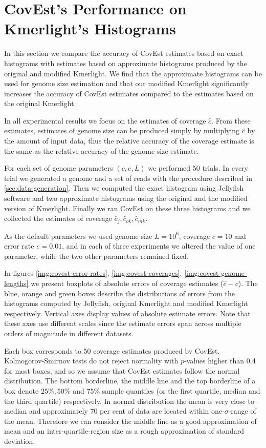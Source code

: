 \section{CovEst's Performance on Kmerlight's Histograms}
In this section we compare the accuracy of CovEst estimates based on exact histograms
with estimates based on approximate histograms produced by the original and modified Kmerlight.
We find that the approximate histograms can be used for genome size estimation and that
our modified Kmerlight significantly increases the accuracy of CovEst estimates compared to
the estimates based on the original Kmerlight.

In all experimental results we focus on the estimates of coverage $\hat c$. From these estimates,
estimates of genome size can be produced simply by multiplying $\hat c$ by the amount of input
data, thus the relative accuracy of the coverage estimate is the same as the relative accuracy of 
the genome size estimate.

For each set of genome parameters $(c, e, L)$ we performed 50 trials.
In every trial we generated a genome and a set of reads with the procedure described
in \ref{sec:data-generation}. Then we computed the exact histogram using Jellyfish software
\cite{Marcais2011}
and two approximate histograms using the original and the modified version of Kmerlight.
Finally we ran CovEst on these three histograms and we collected the estimates of coverage
$\hat c_j, \hat c_{ok}, \hat c_{mk}$. 

As the default parameters we used genome size $L=10^6$, coverage $c=10$ and error rate $e=0.01$,
and in each of three experiments we altered the value of one parameter, while the two other parameters
remained fixed. 

In figures \ref{img:covest-error-rates}, \ref{img:covest-coverages}, 
\ref{img:covest-genome-lengths} we present boxplots of absolute errors of coverage estimates
($\hat c - c$). The blue, orange and green boxes describe the distributions of errors
from the histograms computed by Jellyfish, original Kmerlight and modified Kmerlight respectively.
Vertical axes display values of absolute estimate errors. Note that these axes use different
scales since the estimate errors span across multiple orders of magnitude in different datasets.

Each box corresponds to 50 coverage estimates produced by CovEst. Kolmogorov-Smirnov tests do not
reject normality with $p$-values higher than 0.4 for most boxes, and so we assume that CovEst
estimates follow the normal distribution. The bottom borderline, the middle line 
and the top borderline of a box denote $25\%, 50\%$ and $75\%$ sample quantiles (or 
the first quartile, median and the third quartile) respectively. In normal distribution the mean is
very close to median and approximately $70$ per cent of data are located within one-$\sigma$-range 
of the mean. Therefore we can consider the middle line as a good approximation of mean and 
an inter-quartile-region size as a rough approximation of standard deviation.    


